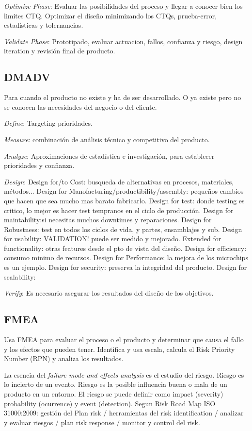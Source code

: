 \documentclass[]{article}
\begin{document}
\textit{Optimize Phase}: Evaluar las posibilidades del proceso y llegar a conocer bien los limites CTQ. Optimizar el diseño minimizando los CTQs, prueba-error, estadisticas y tolernancias.

\textit{Validate Phase}: Prototipado, evaluar actuacion, fallos, confianza y riesgo, design iteration y revisión final de producto.

\subsection{DMADV} Para cuando el producto no existe y ha de ser desarrollado. O ya existe pero no se conocen las necesidades del negocio o del cliente. 

\textit{Define}: Targeting prioridades.

\textit{Measure}: combinación de análisis técnico y competitivo del producto. 

\textit{Analyze}: Aproximaciones de estadística e investigación, para establecer prioridades y confianza.

\textit{Design}: Design for/to Cost: busqueda de alternativas en procesos, materiales, métodos... Design for Manofacturing/productibility/assembly: pequeños cambios que hacen que sea mucho mas barato fabricarlo. Design for test: donde testing es critico, lo mejor es hacer test tempranos en el ciclo de producción. Design for maintability:si necesitas muchos downtimes y reparaciones. Design for Robustness: test en todos los ciclos de vida, y partes, ensamblajes y sub. Design for usability: VALIDATION!  puede ser medido y mejorado. Extended for functionality: otras features desde el pto de vista del diseño. Design for efficiency: consumo minimo de recursos. Design for Performance: la mejora de los microchips es un ejemplo. Design for security: preserva la integridad del producto. Design for scalability: 

\textit{Verify}: Es necesario asegurar los resultados del diseño de los objetivos. 

\subsection{FMEA} Usa FMEA para evaluar el proceso o el producto y determinar que causa el fallo y los efectos que pueden tener. 
Identifica y usa escala, calcula el Risk Priority Number (RPN) y analiza los resultados.

La esencia del \textit{failure mode and effects analysis} es el estudio del riesgo. Riesgo es lo incierto de un evento. Riesgo es la posible influencia buena o mala de un producto en un entorno. El riesgo se puede definir como impact (severity)  probability (ocurrence) y event (detection). Segun Risk Road Map ISO 31000:2009: gestión del Plan risk / herramientas del risk identification / analizar y evaluar riesgos / plan risk response / monitor y control del risk.
\end{document}
